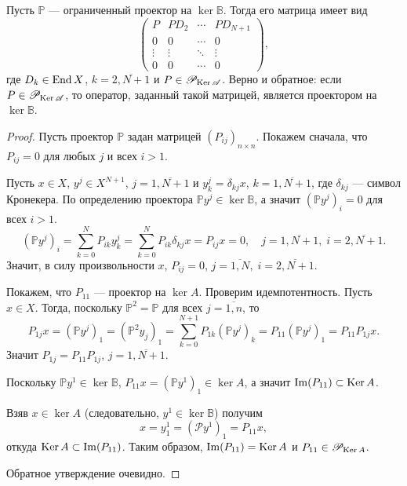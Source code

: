 \begin{lemma}\label{le:kerproj}
    Пусть $\mathbb P$ --- ограниченный проектор на $\ker \mathbb B$. Тогда его матрица имеет вид
    \[ \begin{pmatrix}
    P & PD_2 & \cdots & PD_{N+1} \\
    0 & 0 & \cdots  & 0 \\
    \vdots & \vdots & \ddots & \vdots \\
    0 & 0 & \cdots & 0
   \end{pmatrix}, \]
   где $D_k \in \operatorname{End} X$, $k = \overline{2,N+1}$ и $P \in \mathcal P_{\operatorname{Ker} \mathcal A}$. Верно и обратное: если $P \in \mathcal P_{\operatorname{Ker} \mathcal A}$, то оператор, заданный такой матрицей, является
   проектором на $\ker \mathbb B$.
\end{lemma}

\begin{proof}
    Пусть проектор $\mathbb P$ задан матрицей $(P_{ij})_{n\times n}$. Покажем сначала, что $P_{ij} = 0$ для любых $j$ и всех $i > 1$.

    Пусть $x \in X$, $y^j \in X^{N+1}$, $j = \overline{1,N+1}$ и $y^j_k = \delta_{kj} x$, $k = \overline{1,N+1}$, где $\delta_{kj}$ --- символ Кронекера. По определению проектора $\mathbb P y^j \in \ker \mathbb B$, а значит $(\mathbb P y^j)_i = 0$ для всех $i > 1$.
    \[ (\mathbb P y^j)_i = \sum_{k = 0}^N P_{ik} y^j_k = \sum_{k = 0}^N P_{ik} \delta_{kj} x = P_{ij} x = 0, \quad j = \overline{1,N+1}, \; i = \overline{2,N+1}. \]
    Значит, в силу произвольности $x$, $P_{ij} = 0$, $j = \overline{1,N}, \; i = \overline{2,N+1}$.

    Покажем, что $P_{11}$ --- проектор на $\ker  A$. Проверим идемпотентность. Пусть $x \in X$. Тогда, поскольку $\mathbb P^2 = \mathbb P$ для всех $j = \overline{1,n}$, то
    \[ P_{1j} x = (\mathbb P y^j)_1 = (\mathbb P^2 y_j)_1 = \sum_{k = 0}^{N+1} P_{1k} (\mathbb P y^j)_k = P_{11} (\mathbb P y^j)_1 = P_{11} P_{1j} x. \]
    Значит $P_{1j} = P_{11} P_{1j}$, $j = \overline{1,N+1}$.

    Поскольку $\mathbb Py^1 \in \ker \mathbb B$, $P_{11} x = (\mathbb P y^1)_1 \in \ker  A$, а значит
    $\operatorname{Im}(P_{11}) \subset \operatorname{Ker}  A$.

    Взяв $x \in \ker  A$ (следовательно, $y^1 \in \ker \mathbb B$) получим
    \[ x = y^1_1 = (\mathcal P y^1)_1 = P_{11} x, \]
    откуда $\operatorname{Ker}  A \subset \operatorname{Im}(P_{11})$.
    Таким образом, $\operatorname{Im}(P_{11}) = \operatorname{Ker}  A$ и $P_{11} \in \mathcal P_{\operatorname{Ker}  A}$.

    Обратное утверждение очевидно.
\end{proof}

